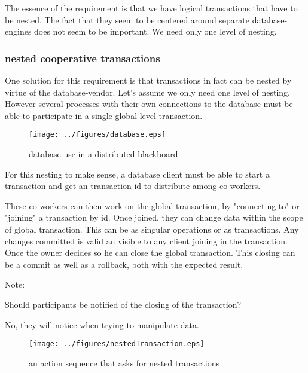 \documentclass[]{lofar}
\begin{document}
      The essence of the requirement is that we have logical
      transactions that have to be nested. The fact that they seem to
      be centered around separate database-engines does not seem to be
      important. We need only one level of nesting.

      \subsubsection{nested cooperative transactions}
      \label{id2719612}\hypertarget{id2719612}{}%

        One solution for this requirement is that transactions in fact
        can be nested by virtue of the database-vendor. Let's assume
        we only need one level of nesting. However several processes
        with their own connections to the database must be able to
        participate in a single global level transaction.

        \begin{figure}
          \texttt{[image: ../figures/database.eps]}
          \hypertarget{figure-database}{}
          \caption{database use in a distributed blackboard\label{figure-database}}
        \end{figure}

        For this nesting to make sense, a database client must be able
        to start a transaction and get an transaction id to distribute
        among co-workers.

        These co-workers can then work on the global transaction, by
        "connecting to" or "joining" a transaction by id. Once joined,
        they can change data within the scope of global
        transaction. This can be as singular operations or as
        transactions. Any changes committed is valid an visible to any
        client joining in the transaction. Once the owner decides so
        he can close the global transaction. This closing can be a
        commit as well as a rollback, both with the expected result.
     
        \begin{em}\large{Note: }

          Should participants be notified of the closing of the transaction?

          No, they will notice when trying to manipulate data.

        \end{em}

        \begin{figure}
          \texttt{[image: ../figures/nestedTransaction.eps]}
          \hypertarget{figure-nestedTransaction}{}
          \caption{an action sequence that asks for nested transactions\label{figure-nestedTransactions}}
        \end{figure}
\end{document}

